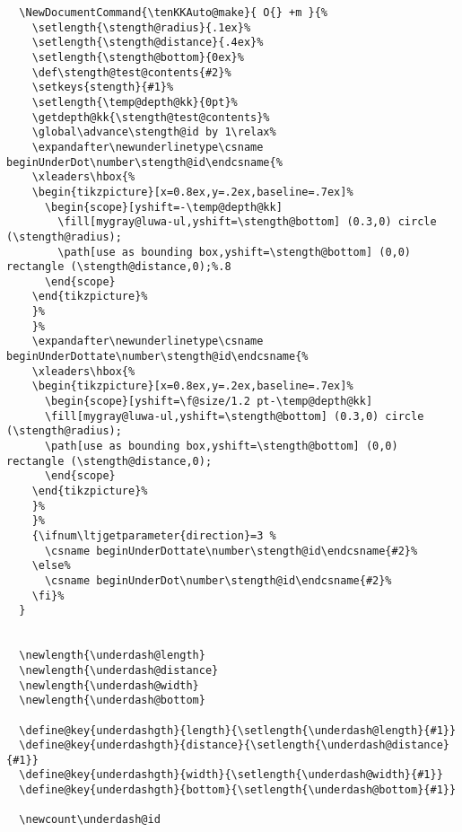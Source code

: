 \documentclass[luatex,fontsize=8pt,paper=b5,twoside]{jlreq}%
\begin{document}
\begin{lstlisting}
  \NewDocumentCommand{\tenKKAuto@make}{ O{} +m }{%
    \setlength{\stength@radius}{.1ex}%
    \setlength{\stength@distance}{.4ex}%
    \setlength{\stength@bottom}{0ex}%
    \def\stength@test@contents{#2}%
    \setkeys{stength}{#1}%
    \setlength{\temp@depth@kk}{0pt}%
    \getdepth@kk{\stength@test@contents}%
    \global\advance\stength@id by 1\relax%
    \expandafter\newunderlinetype\csname beginUnderDot\number\stength@id\endcsname{%
    \xleaders\hbox{%
    \begin{tikzpicture}[x=0.8ex,y=.2ex,baseline=.7ex]%
      \begin{scope}[yshift=-\temp@depth@kk]
        \fill[mygray@luwa-ul,yshift=\stength@bottom] (0.3,0) circle (\stength@radius);
        \path[use as bounding box,yshift=\stength@bottom] (0,0) rectangle (\stength@distance,0);%.8
      \end{scope}
    \end{tikzpicture}%
    }%
    }%
    \expandafter\newunderlinetype\csname beginUnderDottate\number\stength@id\endcsname{%
    \xleaders\hbox{%
    \begin{tikzpicture}[x=0.8ex,y=.2ex,baseline=.7ex]%
      \begin{scope}[yshift=\f@size/1.2 pt-\temp@depth@kk]
      \fill[mygray@luwa-ul,yshift=\stength@bottom] (0.3,0) circle (\stength@radius);
      \path[use as bounding box,yshift=\stength@bottom] (0,0) rectangle (\stength@distance,0);
      \end{scope}
    \end{tikzpicture}%
    }%
    }%
    {\ifnum\ltjgetparameter{direction}=3 %
      \csname beginUnderDottate\number\stength@id\endcsname{#2}%
    \else%
      \csname beginUnderDot\number\stength@id\endcsname{#2}%
    \fi}%
  }


  \newlength{\underdash@length}
  \newlength{\underdash@distance}
  \newlength{\underdash@width}
  \newlength{\underdash@bottom}

  \define@key{underdashgth}{length}{\setlength{\underdash@length}{#1}}
  \define@key{underdashgth}{distance}{\setlength{\underdash@distance}{#1}}
  \define@key{underdashgth}{width}{\setlength{\underdash@width}{#1}}
  \define@key{underdashgth}{bottom}{\setlength{\underdash@bottom}{#1}}

  \newcount\underdash@id 


\end{lstlisting}
\end{document}
